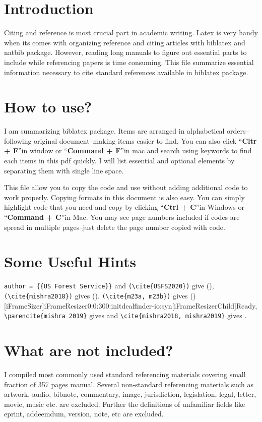 \documentclass{article}
\begin{document}
\begin{multicols}{2}
\section*{Introduction}
Citing and reference is most crucial part in academic writing. Latex is very handy when its comes with organizing reference and citing articles with biblatex and natbib package. However, reading long manuals to figure out essential parts to include while referencing papers is time consuming. This file summarize essential information necessary to cite standard references available in biblatex package.

\section*{How to use?}
I am summarizing biblatex package. Items are arranged in alphabetical orders--following original document--making items easier to find. You can also click \textquotedblleft \textbf{Cltr + F}\textquotedblright in window or \textquotedblleft \textbf{Command + F}\textquotedblright in mac and search using keywords to find each items in this pdf quickly. I will list essential and optional elements by separating them with single line space.

This file allow you to copy the code and use without adding additional code to work properly. Copying formats in this document is also easy. You can simply highlight code that you need and copy by clicking \textquotedblleft \textbf{Ctrl + C}\textquotedblright in Windows or \textquotedblleft \textbf{Command + C}\textquotedblright in Mac. You may see page numbers included if codes are spread in multiple pages--just delete the page number copied with code.

\section*{Some Useful Hints}
\verb|author = {{US Forest Service}}| and \verb|(\cite{USFS2020})| give (\cite{USFS2020}), \verb|(\cite{mishra2018})| gives (\cite{mishra2018}). \verb|(\cite{m23a, m23b})| gives (\cite{m23a, m23b})[iFrameSizer]iFrameResizer0:0:300:initdealfinder-io:syn[iFrameResizerChild]Ready, \verb|\parencite{mishra 2019}| gives \parencite{mishra2019} and \verb|\cite{mishra2018, mishra2019}| gives \cite{mishra2018, mishra2019}.

\section*{What are not included?}
I compiled most commonly used standard referencing materials covering small fraction of 357 pages manual. Several non-standard referencing materials such as artwork, audio, bibnote, commentary, image, jurisdiction, legislation, legal, letter, movie, music etc. are excluded. Further the definitions of unfamiliar fields like eprint, addeemdum, version, note, etc are excluded.


\end{multicols}
\end{document}
